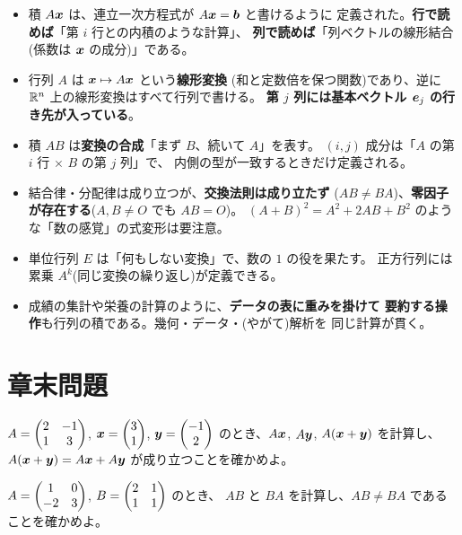 \begin{matome}
\begin{itemize}
\item 積 $A\bm{x}$ は、連立一次方程式が $A\bm{x} = \bm{b}$ と書けるように
定義された。\textbf{行で読めば}「第 $i$ 行との内積のような計算」、
\textbf{列で読めば}「列ベクトルの線形結合(係数は $\bm{x}$ の成分)」である。
\item 行列 $A$ は $\bm{x} \mapsto A\bm{x}$ という\textbf{線形変換}
(和と定数倍を保つ関数)であり、逆に $\mathbb{R}^n$ 上の線形変換はすべて行列で書ける。
\textbf{第 $j$ 列には基本ベクトル $\bm{e}_j$ の行き先が入っている}。
\item 積 $AB$ は\textbf{変換の合成}「まず $B$、続いて $A$」を表す。
$(i,j)$ 成分は「$A$ の第 $i$ 行 $\times$ $B$ の第 $j$ 列」で、
内側の型が一致するときだけ定義される。
\item 結合律・分配律は成り立つが、\textbf{交換法則は成り立たず}
($AB \neq BA$)、\textbf{零因子が存在する}($A, B \neq O$ でも $AB = O$)。
$(A + B)^2 = A^2 + 2AB + B^2$ のような「数の感覚」の式変形は要注意。
\item 単位行列 $E$ は「何もしない変換」で、数の $1$ の役を果たす。
正方行列には累乗 $A^k$(同じ変換の繰り返し)が定義できる。
\item 成績の集計や栄養の計算のように、\textbf{データの表に重みを掛けて
要約する操作}も行列の積である。幾何・データ・(やがて)解析を
同じ計算が貫く。
\end{itemize}
\end{matome}

\section*{章末問題}

\begin{mondai}[基本]\label{q:matmul-ex1}
$A = \begin{pmatrix}2 & -1 \\ 1 & 3\end{pmatrix}$, $\bm{x} = \begin{pmatrix}3 \\ 1\end{pmatrix}$,
$\bm{y} = \begin{pmatrix}-1 \\ 2\end{pmatrix}$ のとき、$A\bm{x}$, $A\bm{y}$,
$A(\bm{x} + \bm{y})$ を計算し、
$A(\bm{x} + \bm{y}) = A\bm{x} + A\bm{y}$ が成り立つことを確かめよ。
\end{mondai}

\begin{mondai}[基本]\label{q:matmul-ex2}
$A = \begin{pmatrix}1 & 0 \\ -2 & 3\end{pmatrix}$, $B = \begin{pmatrix}2 & 1 \\ 1 & 1\end{pmatrix}$ のとき、
$AB$ と $BA$ を計算し、$AB \neq BA$ であることを確かめよ。
\end{mondai}

